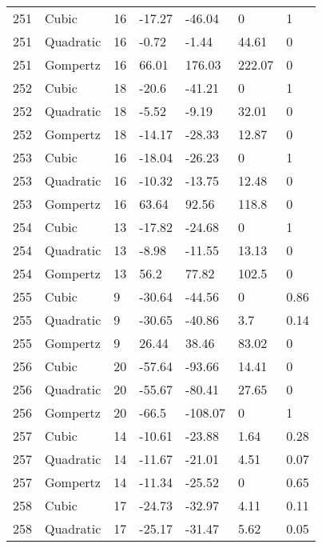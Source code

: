 \documentclass[11pt]{article}
\begin{document}
\begin{center}
\begin{longtable}{lllllll}
    251 & Cubic     & 16              & -17.27  & -46.04  & 0       & 1    \\
    251 & Quadratic & 16              & -0.72   & -1.44   & 44.61   & 0    \\
    251 & Gompertz  & 16              & 66.01   & 176.03  & 222.07  & 0    \\
    252 & Cubic     & 18              & -20.6   & -41.21  & 0       & 1    \\
    252 & Quadratic & 18              & -5.52   & -9.19   & 32.01   & 0    \\
    252 & Gompertz  & 18              & -14.17  & -28.33  & 12.87   & 0    \\
    253 & Cubic     & 16              & -18.04  & -26.23  & 0       & 1    \\
    253 & Quadratic & 16              & -10.32  & -13.75  & 12.48   & 0    \\
    253 & Gompertz  & 16              & 63.64   & 92.56   & 118.8   & 0    \\
    254 & Cubic     & 13              & -17.82  & -24.68  & 0       & 1    \\
    254 & Quadratic & 13              & -8.98   & -11.55  & 13.13   & 0    \\
    254 & Gompertz  & 13              & 56.2    & 77.82   & 102.5   & 0    \\
    255 & Cubic     & 9               & -30.64  & -44.56  & 0       & 0.86 \\
    255 & Quadratic & 9               & -30.65  & -40.86  & 3.7     & 0.14 \\
    255 & Gompertz  & 9               & 26.44   & 38.46   & 83.02   & 0    \\
    256 & Cubic     & 20              & -57.64  & -93.66  & 14.41   & 0    \\
    256 & Quadratic & 20              & -55.67  & -80.41  & 27.65   & 0    \\
    256 & Gompertz  & 20              & -66.5   & -108.07 & 0       & 1    \\
    257 & Cubic     & 14              & -10.61  & -23.88  & 1.64    & 0.28 \\
    257 & Quadratic & 14              & -11.67  & -21.01  & 4.51    & 0.07 \\
    257 & Gompertz  & 14              & -11.34  & -25.52  & 0       & 0.65 \\
    258 & Cubic     & 17              & -24.73  & -32.97  & 4.11    & 0.11 \\
    258 & Quadratic & 17              & -25.17  & -31.47  & 5.62    & 0.05 \\

\end{longtable}
\end{center}
\end{document}
